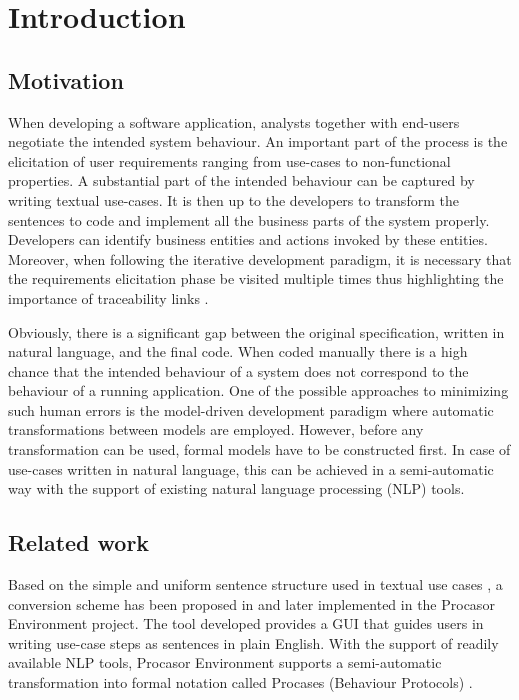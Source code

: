 \section{Introduction}

\subsection{Motivation}
When developing a software application, analysts together with end-users negotiate the intended system behaviour.  An important part of the process is the elicitation of user requirements ranging from use-cases to non-functional properties.  A substantial part of the intended behaviour can be captured by writing textual use-cases.  It is then up to the developers to transform the sentences to code and implement all the business parts of the system properly.  Developers can identify business entities and actions invoked by these entities.  Moreover, when following the iterative development paradigm, it is necessary that the requirements elicitation phase be visited multiple times thus highlighting the importance of traceability links \cite{Larman}.

Obviously, there is a significant gap between the original specification, written in natural language, and the final code.  When coded manually there is a high chance that the intended behaviour of a system does not correspond to the behaviour of a running application.  One of the possible approaches to minimizing such human errors is the model-driven development paradigm \cite{MDD} where automatic transformations between models are employed.  However, before any transformation can be used, formal models have to be constructed first.  In case of use-cases written in natural language, this can be achieved in a semi-automatic way with the support of existing natural language processing (NLP) tools.

\subsection{Related work}
Based on the simple and uniform sentence structure used in textual use cases \cite{Cockburn:2000:WEU:517669}, a conversion scheme has been proposed in \cite{MenclDeriving}\cite{MenclImprovedDeriving} and later implemented in the Procasor Environment project.  The tool developed provides a GUI that guides users in writing use-case steps as sentences in plain English.  With the support of readily available NLP tools, Procasor Environment supports a semi-automatic transformation into formal notation called Procases (Behaviour Protocols) \cite{BehaviourProtocols}.

